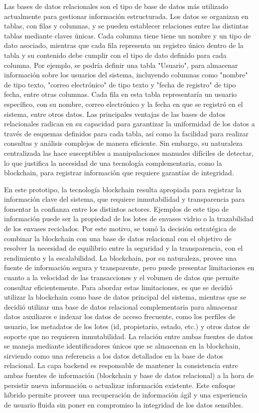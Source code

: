 Las bases de datos relacionales son el tipo de base de datos más utilizado actualmente para gestionar información estructurada. Los datos se organizan en tablas, con filas y columnas, y se pueden establecer relaciones entre las distintas tablas mediante claves únicas. Cada columna tiene tiene un nombre y un tipo de dato asociado, mientras que cada fila representa un registro único dentro de la tabla y su contenido debe cumplir con el tipo de dato definido para cada columna. Por ejemplo, se podría definir una tabla "Usuario", para almacenar información sobre los usuarios del sistema, incluyendo columnas como "nombre" de tipo texto, "correo electrónico" de tipo texto y "fecha de registro" de tipo fecha, entre otras columnas. Cada fila en esta tabla representaría un usuario específico, con su nombre, correo electrónico y la fecha en que se registró en el sistema, entre otros datos. Las principales ventajas de las bases de datos relacionales radican en su capacidad para garantizar la uniformidad de los datos a través de esquemas definidos para cada tabla, así como la facilidad para realizar consultas y análisis complejos de manera eficiente. Sin embargo, su naturaleza centralizada las hace susceptibles a manipulaciones manuales difíciles de detectar, lo que justifica la necesidad de una tecnología complementaria, como la blockchain, para registrar información que requiere garantías de integridad.

En este prototipo, la tecnología blockchain resulta apropiada para registrar la información clave del sistema, que requiere inmutabilidad y transparencia para fomentar la confianza entre los distintos actores. Ejemplos de este tipo de información puede ser la propiedad de los lotes de envases vidrio o la trazabilidad de los envases reciclados. Por este motivo, se tomó la decisión estratégica de combinar la blockchain con una base de datos relacional con el objetivo de resolver la necesidad de equilibrio entre la seguridad y la transparencia, con el rendimiento y la escalabilidad. La blockchain, por su naturaleza, provee una fuente de información segura y transparente, pero puede presentar limitaciones en cuanto a la velocidad de las transacciones y el volumen de datos que permite consultar eficientemente. Para abordar estas limitaciones, es que se decidió utilizar la blockchain como base de datos principal del sistema, mientras que se decidió utilizar una base de datos relacional complementaria para almacenar datos auxiliares e indexar los datos de acceso frecuente, como los perfiles de usuario, los metadatos de los lotes (id, propietario, estado, etc.) y otros datos de soporte que no requieren inmutabilidad. La relación entre ambas fuentes de datos se maneja mediante identificadores únicos que se almacenan en la blockchain, sirviendo como una referencia a los datos detallados en la base de datos relacional. La capa backend es responsable de mantener la consistencia entre ambas fuentes de información (blockchain y base de datos relacional) a la hora de persistir nueva información o actualizar información existente. Este enfoque híbrido permite proveer una recuperación de información ágil y una experiencia de usuario fluida sin poner en compromiso la integridad de los datos sensibles.

